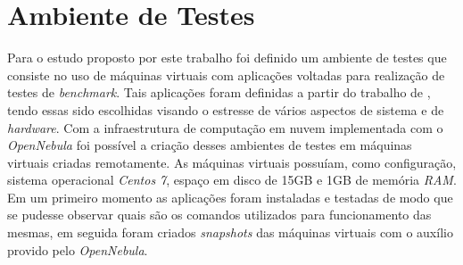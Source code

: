 	
\section{Ambiente de Testes}\label{sec:ambiente_teste}
Para o estudo proposto por este trabalho foi definido um  ambiente de testes que consiste no uso de máquinas virtuais com aplicações voltadas para realização
de testes de \textit{benchmark}. Tais aplicações foram definidas a partir do trabalho de , tendo essas sido escolhidas visando o estresse de vários aspectos de sistema e de \textit{hardware}. Com a infraestrutura de computação em nuvem implementada com o \textit{OpenNebula} foi possível a criação desses ambientes de testes em máquinas virtuais criadas remotamente. As máquinas virtuais possuíam, como configuração, sistema operacional \textit{Centos 7}, espaço em disco de 15GB e 1GB de memória \textit{RAM}. Em um primeiro momento as aplicações foram instaladas e testadas de modo que se pudesse observar quais são os comandos utilizados para funcionamento das mesmas, em seguida foram criados \textit{snapshots} das máquinas virtuais com o auxílio provido pelo \textit{OpenNebula}. 

